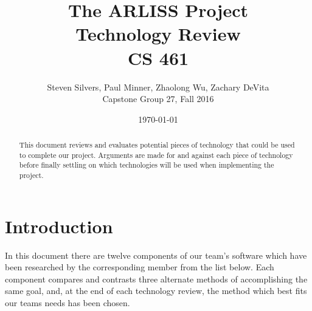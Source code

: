 \documentclass[10pt,letterpaper,onecolumn,journal]{IEEEtran}
\begin{document}
\pagecolor{BackColor}

\begin{titlepage}
	\title{The ARLISS Project\\Technology Review\\CS 461}
	\author{Steven Silvers, Paul Minner, Zhaolong Wu, Zachary DeVita\\
		Capstone Group 27, Fall 2016}
	\date{\today}
	\maketitle
	\vspace{4cm}
	\begin{abstract}
		\noindent This document reviews and evaluates potential pieces of technology that could be used to complete our project. Arguments are made for and against each piece of technology before finally settling on which technologies will be used when implementing the project.
	\end{abstract}

\end{titlepage}
\tableofcontents
\clearpage

\section{Introduction}

In this document there are twelve components of our team's software which have been researched by the corresponding member from the list below. Each component compares and contrasts three alternate methods of accomplishing the same goal, and, at the end of each technology review, the method which best fits our teams needs has been chosen.
\end{document}

